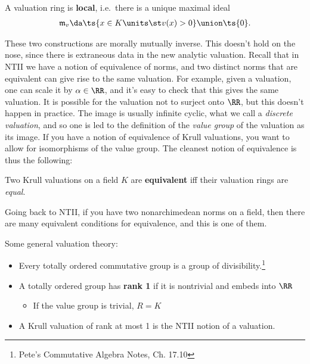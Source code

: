 \begin{exercise}[?]

A valuation ring is \textbf{local}, i.e.~there is a unique maximal ideal
\begin{align*}  
\mathfrak{m}_v \da \ts{x\in K\units \st v(x) > 0} \union \ts{0}
.\end{align*}

\end{exercise}

\begin{remark}

These two constructions are morally mutually inverse. This doesn't hold
on the nose, since there is extraneous data in the new analytic
valuation. Recall that in NTII we have a notion of equivalence of norms,
and two distinct norms that are equivalent can give rise to the same
valuation. For example, given a valuation, one can scale it by
\(\alpha \in \RR\), and it's easy to check that this gives the same
valuation. It is possible for the valuation not to surject onto \(\RR\),
but this doesn't happen in practice. The image is usually infinite
cyclic, what we call a \emph{discrete valuation}, and so one is led to
the definition of the \emph{value group} of the valuation as its image.
If you have a notion of equivalence of Krull valuations, you want to
allow for isomorphisms of the value group. The cleanest notion of
equivalence is thus the following:

\end{remark}

\begin{definition}

Two Krull valuations on a field \(K\) are \textbf{equivalent} iff their
valuation rings are \emph{equal}.

\end{definition}

\begin{remark}

Going back to NTII, if you have two nonarchimedean norms on a field,
then there are many equivalent conditions for equivalence, and this is
one of them.

\end{remark}

Some general valuation theory:

\begin{itemize}
\item
  Every totally ordered commutative group is a group of
  divisibility.\footnote{Pete's Commutative Algebra Notes, Ch. 17.10}
\item
  A totally ordered group has \textbf{rank 1} if it is nontrivial and
  embeds into \(\RR\)

  \begin{itemize}
  \tightlist
  \item
    If the value group is trivial, \(R = K\)
  \end{itemize}
\item
  A Krull valuation of rank at most 1 is the NTII notion of a valuation.
\end{itemize}

